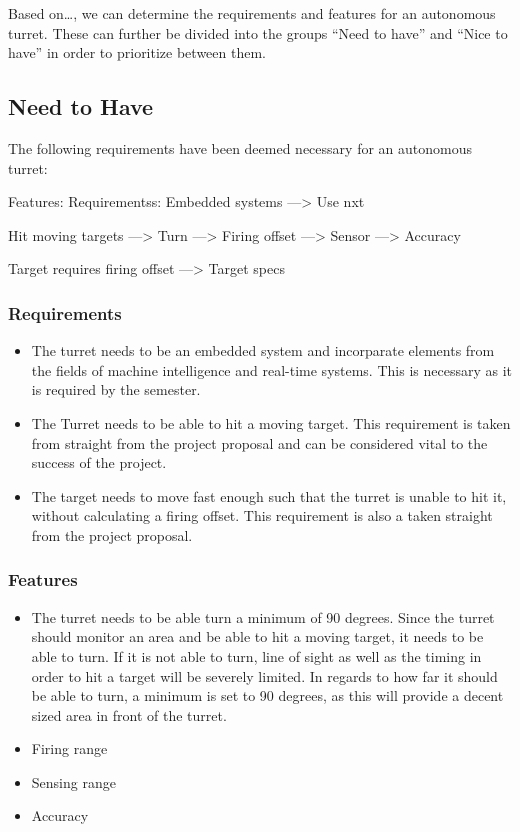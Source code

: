 Based on\ldots, we can determine the requirements and features for an autonomous
turret. These can further be divided into the groups ``Need to have'' and ``Nice
to have'' in order to prioritize between them.

\subsection{Need to Have}
The following requirements have been deemed necessary for an autonomous turret:

Features:                       Requirementss:
Embedded systems                ---> Use nxt

Hit moving targets              ---> Turn
                                ---> Firing offset
                                ---> Sensor
                                ---> Accuracy

Target requires firing offset   ---> Target specs


\subsubsection{Requirements}
\begin{itemize}
  \item The turret needs to be an embedded system and incorparate elements from
the fields of machine intelligence and real-time systems. This is necessary as
it is required by the semester.
  \item The Turret needs to be able to hit a moving target. This requirement is
taken from straight from the project proposal and can be considered vital to the
success of the project.
\item The target needs to move fast enough such that the turret is unable to
hit it, without calculating a firing offset. This requirement is also a taken
straight from the project proposal.
\end{itemize}

\subsubsection{Features}
\begin{itemize}
  \item The turret needs to be able turn a minimum of 90 degrees. Since the
turret should monitor an area and be able to hit a moving target, it needs to
be able to turn. If it is not able to turn, line of sight as well as the
timing in order to hit a target will be severely limited. In regards to how
far it should be able to turn, a minimum is set to 90 degrees, as this will
provide a decent sized area in front of the turret.
\item Firing range
\item Sensing range
\item Accuracy
\end{itemize}
